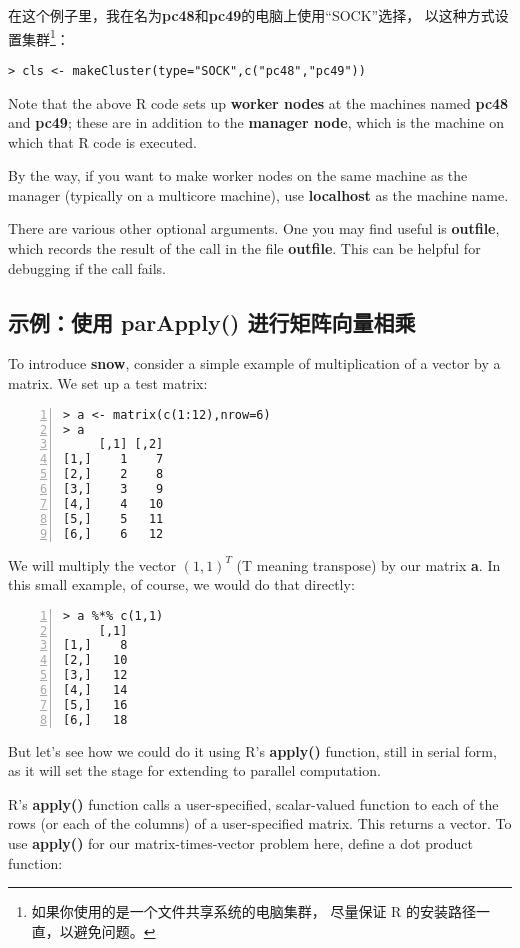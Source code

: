 在这个例子里，我在名为{\bf pc48}和{\bf pc49}的电脑上使用``SOCK''选择，
以这种方式设置集群\footnote{如果你使用的是一个文件共享系统的电脑集群，
尽量保证 R 的安装路径一直，以避免问题。}：

\begin{lstlisting}
> cls <- makeCluster(type="SOCK",c("pc48","pc49"))
\end{lstlisting}

Note that the above R code sets up {\bf worker nodes} at the machines
named {\bf pc48} and {\bf pc49}; these are in addition to the {\bf
manager node}, which is the machine on which that R code is
executed.

By the way, if you want to make worker nodes on the same machine as the
manager (typically on a multicore machine), use {\bf localhost} as the
machine name.

There are various other optional arguments.  One you may find useful is
{\bf outfile}, which records the result of the call in the file {\bf
outfile}.  This can be helpful for debugging if the call fails.

\subsection{示例：使用 parApply() 进行矩阵向量相乘}

To introduce {\bf snow}, consider a simple example of multiplication of
a vector by a matrix.  We set up a test matrix:

\begin{lstlisting}[numbers=left]
> a <- matrix(c(1:12),nrow=6)
> a
     [,1] [,2]
[1,]    1    7
[2,]    2    8
[3,]    3    9
[4,]    4   10
[5,]    5   11
[6,]    6   12
\end{lstlisting}

We will multiply the vector $(1,1)^{T}$ (T meaning transpose) by our
matrix {\bf a}.  In this small example, of course, we would do that
directly:

\begin{lstlisting}[numbers=left]
> a %*% c(1,1)
     [,1]
[1,]    8
[2,]   10
[3,]   12
[4,]   14
[5,]   16
[6,]   18
\end{lstlisting}


But let's see how we could do it using R's {\bf apply()} function, still
in serial form, as it will set the stage for extending to parallel
computation.

R's {\bf apply()} function calls a user-specified, scalar-valued
function to each of the rows (or each of the columns) of a
user-specified matrix.  This returns a vector.  To use {\bf apply()} for
our matrix-times-vector problem here, define a dot product function:

